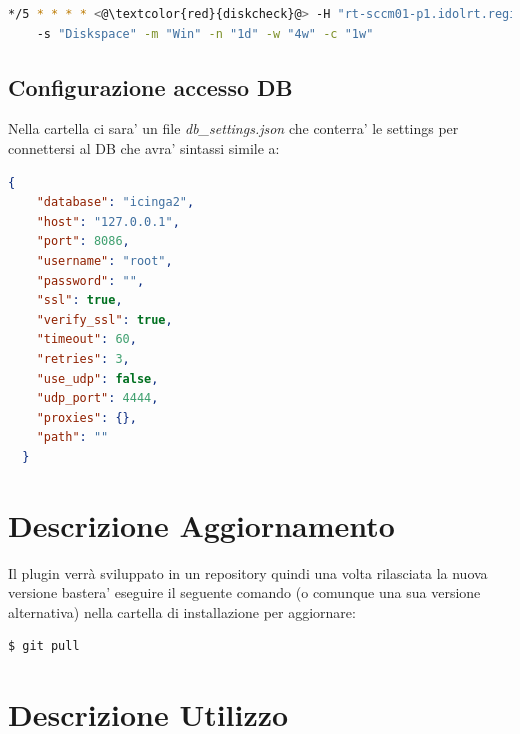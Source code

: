\documentclass{article}
\begin{document}
\begin{lstlisting}[language=Bash]
*/5 * * * * <@\textcolor{red}{diskcheck}@> -H "rt-sccm01-p1.idolrt.regione.toscana.it"
    -s "Diskspace" -m "Win" -n "1d" -w "4w" -c "1w"
\end{lstlisting}

\subsection*{Configurazione accesso DB}

Nella cartella ci sara' un file \textit{db\_settings.json} che conterra' le settings per connettersi al DB che avra' sintassi simile a:

\begin{lstlisting}[language=json]
{
    "database": "icinga2",
    "host": "127.0.0.1",
    "port": 8086,
    "username": "root",
    "password": "",
    "ssl": true,
    "verify_ssl": true,
    "timeout": 60,
    "retries": 3,
    "use_udp": false,
    "udp_port": 4444,
    "proxies": {},
    "path": ""
  }
\end{lstlisting}

\section*{Descrizione Aggiornamento}
Il plugin verrà sviluppato in un repository quindi una volta rilasciata la nuova versione bastera' eseguire il seguente comando (o comunque una sua versione alternativa) nella cartella di installazione per aggiornare:
\begin{lstlisting}[language=Bash]
$ git pull
\end{lstlisting}

\clearpage

\section*{Descrizione Utilizzo}
\end{document}
